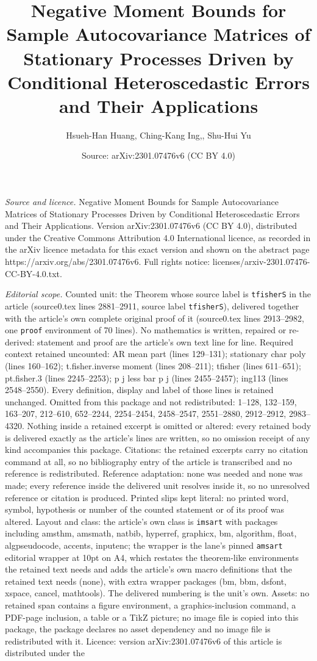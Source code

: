 \documentclass[10pt,a4paper]{amsart}
\title[Negative Moment Bounds for Sample Autocovariance Matrices of]{Negative Moment Bounds for Sample Autocovariance Matrices of Stationary Processes Driven by Conditional Heteroscedastic Errors and Their Applications}
\author{Hsueh-Han Huang, Ching-Kang Ing,, Shu-Hui Yu}
\date{Source: arXiv:2301.07476v6 (CC BY 4.0)}
\begin{document}
\maketitle

\noindent\emph{Source and licence.} Negative Moment Bounds for Sample Autocovariance Matrices of Stationary Processes Driven by Conditional Heteroscedastic Errors and Their Applications. Version arXiv:2301.07476v6 (CC BY 4.0), distributed under the Creative Commons Attribution 4.0 International licence, as recorded in the arXiv licence metadata for this exact version and shown on the abstract page https://arxiv.org/abs/2301.07476v6. Full rights notice: licenses/arxiv-2301.07476-CC-BY-4.0.txt.\par\smallskip

\noindent\textit{Editorial scope.} Counted unit: the Theorem whose source label is \texttt{tfisherS} in the article (source0.tex lines 2881--2911, source label \texttt{tfisherS}), delivered together with the article's own complete original proof of it (source0.tex lines 2913--2982, one \texttt{proof} environment of 70 lines). No mathematics is written, repaired or re-derived: statement and proof are the article's own text line for line. Required context retained uncounted: AR mean part (lines 129--131); stationary char poly (lines 160--162); t.fisher.inverse moment (lines 208--211); tfisher (lines 611--651); pt.fisher.3 (lines 2245--2253); p j less bar p j (lines 2455--2457); ing113 (lines 2548--2550). Every definition, display and label of those lines is retained unchanged. Omitted from this package and not redistributed: 1--128, 132--159, 163--207, 212--610, 652--2244, 2254--2454, 2458--2547, 2551--2880, 2912--2912, 2983--4320. Nothing inside a retained excerpt is omitted or altered: every retained body is delivered exactly as the article's lines are written, so no omission receipt of any kind accompanies this package. Citations: the retained excerpts carry no citation command at all, so no bibliography entry of the article is transcribed and no reference is redistributed. Reference adaptation: none was needed and none was made; every reference inside the delivered unit resolves inside it, so no unresolved reference or citation is produced. Printed slips kept literal: no printed word, symbol, hypothesis or number of the counted statement or of its proof was altered. Layout and class: the article's own class is \texttt{imsart} with packages including amsthm, amsmath, natbib, hyperref, graphicx, bm, algorithm, float, algpseudocode, accents, inputenc; the wrapper is the lane's pinned \texttt{amsart} editorial wrapper at 10pt on A4, which restates the theorem-like environments the retained text needs and adds the article's own macro definitions that the retained text needs (none), with extra wrapper packages (bm, bbm, dsfont, xspace, cancel, mathtools). The delivered numbering is the unit's own. Assets: no retained span contains a figure environment, a graphics-inclusion command, a PDF-page inclusion, a table or a TikZ picture; no image file is copied into this package, the package declares no asset dependency and no image file is redistributed with it. Licence: version arXiv:2301.07476v6 of this article is distributed under the 
\end{document}
